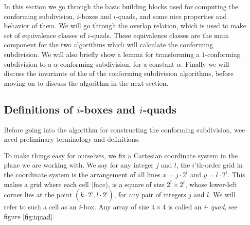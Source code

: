 In this section we go through the basic building blocks used for computing the conforming 
subdivision, $i$-boxes and $i$-quads, and some nice properties and behavior of them. We will go 
through the overlap relation, which is used to make set of equivalence classes of $i$-quads. These 
equivalence classes are the main component for the two algorithms which will calculate the conforming 
subdivision. We will also briefly show a lemma for transforming a $1$-conforming subdivision to a 
$\alpha$-conforming subdivision, for a constant $\alpha$. Finally we will discuss the invariants of 
the of the conforming subdivision algorithms, before moving on to discuss the algorithm in the next 
section. 

\subsection{Definitions of $i$-boxes and $i$-quads}

Before going into the algorithm for constructing the conforming subdivision, wee need
preliminary terminology and definitions.

To make things easy for ourselves, we fix a Cartesian coordinate system in the plane we are 
working with. We say for any integer $j$ and $l$, the $i$'th-order grid in the coordinate 
system is the arrangement of all lines $x = j \cdot 2^i$ and $y = l \cdot 2^i$. This makes a 
grid where each cell (face), is a square of size $2^i \times 2 ^i$, whose lower-left corner 
lies at the point $(k \cdot 2^i, l \cdot 2^i)$, for any pair of integers $j$ and $l$. We will 
refer to such a cell as an $i$-box. Any array of size $4 \times 4$ is called an \textit{i-
quad}, see figure \ref{fig:iquad}.


